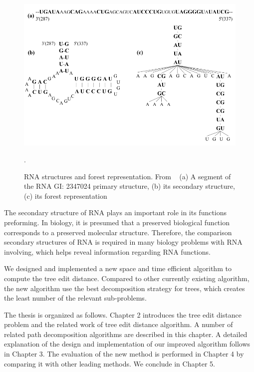 \begin{figure}
		\centering
		\includegraphics[width=14cm,clip]{Figures/RNATreeRepresentation}
		\label{RNA structures and forest representation} 
		\caption{RNA structures and forest representation. From ~\cite{Liang2012} (a) A segment of the RNA GI: 2347024 primary structure, (b) its secondary structure, (c) its forest representation}. 
\end{figure}

The secondary structure of RNA plays an important role in its functions preforming. In biology, it is presumed that a preserved biological function corresponds to a preserved molecular structure. Therefore, the comparison secondary structures of RNA is required in many biology problems with RNA involving, which helps reveal information regarding RNA functions.

We designed and implemented a new space and time efficient algorithm to compute the tree edit distance. Compared to other currently existing algorithm, the new algorithm use the best decomposition strategy for trees, which creates the least number of the relevant sub-problems. 

The thesis is organized as follows. Chapter 2 introduces the tree edit distance problem and the related work of tree edit distance algorithm. A number of related path decomposition algorithms are described in this chapter. A detailed explanation of the design and implementation of our improved algorithm follows in Chapter 3. The evaluation of the new method is performed in Chapter 4 by comparing it with other leading methods. We conclude in Chapter 5.
